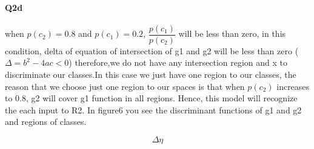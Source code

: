 \documentclass[12pt]{article}
\begin{document}
	
								
								\paragraph{Q2d}	when $p(c_{2})=0.8$ and $p(c_{1})=0.2 $,   $\dfrac{p(c_{1})}{p(c_{2})}$ will be less than zero, in this condition, delta of equation of intersection of g1 and g2 will be less than zero	($\Delta=b^{2}-4ac<0$) therefore,we do not have any intersection region and x to discriminate our classes.In this case we just have one region to our classes, the reason that we choose just one region to our spaces is that when $ p(c_{2}) $ increases to 0.8, g2 will cover g1 function in all regions. Hence, this model will recognize the each input to R2. In figure6 you see the discriminant functions of g1 and g2 and regions of classes.
								
						



$$\varDelta\eta$$

	\newpage
		
\end{document}
